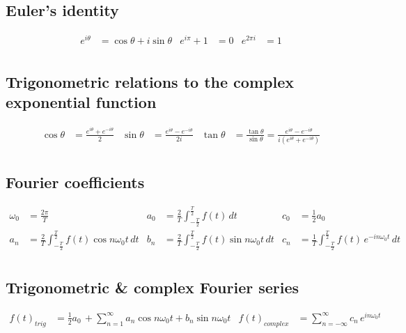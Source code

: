 \subsection*{Euler's identity}
\begin{align*}
  e^{i\theta } &= \cos{\theta} +i\sin{\theta} & e^{i\pi}+1&= 0 & e^{2\pi i} &= 1\\
\end{align*}

\subsection*{Trigonometric relations to the complex exponential function}
\begin{align*}
  \cos{\theta} &= \frac{e^{i\theta}+e^{-i\theta}}{2}
  &\sin{\theta} &= \frac{e^{i\theta}-e^{-i\theta}}{2i}
  &\tan{\theta} &= \frac{\tan{\theta}}{\sin{\theta}} = \frac{e^{i\theta}-e^{-i\theta}}{i(e^{i\theta}+e^{-i\theta})}\\
\end{align*}

\subsection*{Fourier coefficients}
\begin{align*}
  \omega_0 &= \frac{2\pi}{T}
  &a_0 &= \frac{2}{T}\int_{-\frac{T}{2}}^{\frac{T}{2}} f(t) \,dt
  &c_0 &= \frac{1}{2}a_0\\
  a_n &= \frac{2}{T}\int_{-\frac{T}{2}}^{\frac{T}{2}}f(t)\cos{n\omega_0t} \,dt
  &b_n &= \frac{2}{T}\int_{-\frac{T}{2}}^{\frac{T}{2}}f(t)\sin{n\omega_0t} \,dt
  &c_n &= \frac{1}{T}\int_{-\frac{T}{2}}^{\frac{T}{2}}f(t)\,e^{-in\omega_0t} \,dt\\
\end{align*}

\subsection*{Trigonometric \& complex Fourier series}
\begin{align*}
  f(t)_{trig} &= \frac{1}{2}a_0 \,+ \sum_{n=1}^{\infty} a_n\cos{n\omega_0t} + b_n\sin{n\omega_0t}
  &f(t)_{complex} &= \sum_{n=-\infty}^{\infty} c_n \,e^{in\omega_0t}
\end{align*}
